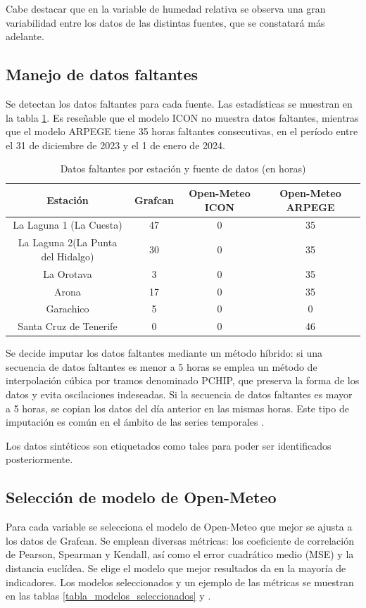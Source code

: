 Cabe destacar que en la variable de humedad relativa se observa una gran variabilidad entre los datos de las distintas fuentes, que se constatará más adelante.

\subsection{Manejo de datos faltantes}
Se detectan los datos faltantes para cada fuente. Las estadísticas se muestran en la tabla \ref{tabla_datos_faltantes}. 
Es reseñable que el modelo ICON no muestra datos faltantes, mientras que el modelo ARPEGE tiene 35 horas faltantes consecutivas, en el período entre el 31 de diciembre de 2023 y el 1 de enero de 2024.

\begin{table}[htb]
    \centering
    \begin{tabular}{|c|c|c|c|}
        \hline
        Estación & Grafcan & Open-Meteo ICON & Open-Meteo ARPEGE \\
        \hline
        La Laguna 1 (La Cuesta) & 47 & 0 & 35 \\
        La Laguna 2(La Punta del Hidalgo) & 30 & 0 & 35 \\
        La Orotava & 3 & 0 & 35 \\
        Arona & 17 & 0 & 35 \\
        Garachico & 5 & 0 & 0 \\
        Santa Cruz de Tenerife & 0 & 0 & 46 \\
        \hline
    \end{tabular}
    \caption{Datos faltantes por estación y fuente de datos (en horas)}
    \label{tabla_datos_faltantes} 
\end{table}

Se decide imputar los datos faltantes mediante un método híbrido: si una secuencia de datos faltantes es menor a 5 horas se emplea 
un método de interpolación cúbica por tramos denominado PCHIP\cite{fritsch1980}, que preserva la forma de los datos y evita oscilaciones indeseadas.
Si la secuencia de datos faltantes es mayor a 5 horas, se copian los datos del día anterior en las mismas horas. 
Este tipo de imputación es común en el ámbito de las series temporales \cite{tawakuli2024}.

Los datos sintéticos son etiquetados como tales para poder ser identificados posteriormente.


\subsection{Selección de modelo de Open-Meteo}
Para cada variable se selecciona el modelo de Open-Meteo que mejor se ajusta a los datos de Grafcan.
Se emplean diversas métricas: los coeficiente de correlación de Pearson, Spearman y Kendall, así como el error cuadrático medio (MSE) y 
la distancia euclídea. Se elige el modelo que mejor resultados da en la mayoría de indicadores. Los modelos seleccionados y un ejemplo de las métricas
 se muestran en las tablas \ref{tabla_modelos_seleccionados} y .

